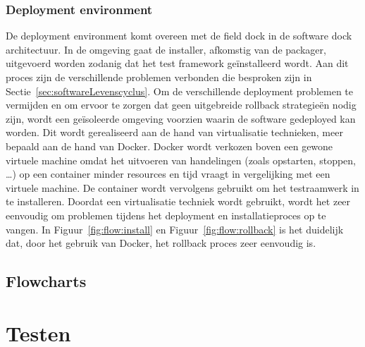\subsubsection{Deployment environment}
De deployment environment komt overeen met de field dock in de software dock architectuur.
In de omgeving gaat de installer, afkomstig van de packager, uitgevoerd worden zodanig dat het test framework geïnstalleerd wordt.
Aan dit proces zijn de verschillende problemen verbonden die besproken zijn in Sectie~\vref{sec:softwareLevenscyclus}.
Om de verschillende deployment problemen te vermijden en om ervoor te zorgen dat geen uitgebreide rollback strategieën nodig zijn, wordt een geïsoleerde omgeving voorzien waarin de software gedeployed kan worden. 
Dit wordt gerealiseerd aan de hand van virtualisatie technieken, meer bepaald aan de hand van Docker.
Docker wordt verkozen boven een gewone virtuele machine omdat het uitvoeren van handelingen (zoals opstarten, stoppen, \ldots) op een container minder resources en tijd vraagt in vergelijking met een virtuele machine.
De container wordt vervolgens gebruikt om het testraamwerk in te installeren.
Doordat een virtualisatie techniek wordt gebruikt, wordt het zeer eenvoudig om problemen tijdens het deployment en installatieproces op te vangen.
In Figuur~\vref{fig:flow:install} en Figuur~\vref{fig:flow:rollback} is het duidelijk dat, door het gebruik van Docker, het rollback proces zeer eenvoudig is.

\subsection{Flowcharts}


\section{Testen}

